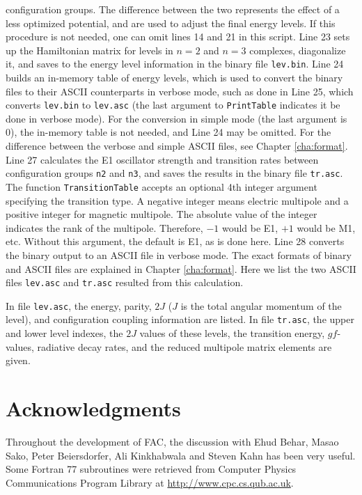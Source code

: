 configuration groups. The difference between the two represents the effect of
a less optimized potential, and are used to adjust the final energy levels. If
this procedure is not needed, one can omit lines 14 and 21 in this script. Line
23 sets up the Hamiltonian matrix for levels in $n = 2$ and $n = 3$ complexes,
diagonalize it, and saves to the energy level information in the binary file
\verb|lev.bin|. Line 24 builds an in-memory table of energy levels, which is
used to convert the binary files to their ASCII counterparts in verbose mode,
such as done in Line 25, which converts \verb|lev.bin| to \verb|lev.asc| (the
last argument to \verb|PrintTable| indicates it be done in verbose mode). For
the conversion in simple mode (the last argument is 0), the in-memory table is
not needed, and Line 24 may be omitted. For the difference between the verbose
and simple ASCII files, see Chapter \ref{cha:format}. Line 27 calculates the
E1 oscillator strength and transition rates between configuration groups
\verb|n2| and \verb|n3|, and saves the results in the binary file
\verb|tr.asc|. The function \verb|TransitionTable| accepts an optional 4th
integer argument specifying the transition type. A negative integer means
electric multipole and a positive integer for magnetic multipole. The absolute
value of the integer indicates the rank of the multipole. Therefore, $-1$ would
be E1, $+1$ would be M1, etc. Without this argument, the default is E1, as is
done here. Line 28 converts the binary output to an ASCII file in verbose
mode. The exact formats of binary and ASCII files are explained in Chapter
\ref{cha:format}. Here we list the two ASCII files \verb|lev.asc| and
\verb|tr.asc| resulted from this calculation. 

\lstset{numbers=none,basicstyle=\scriptsize,caption=demo/structure/lev.asc}

\lstset{numbers=none,basicstyle=\normalsize,caption=demo/structure/tr.asc}

In file \verb|lev.asc|, the energy, parity, $2J$ ($J$ is the total
angular momentum of the level), and configuration coupling information are
listed. In file \verb|tr.asc|, the upper and lower level indexes, the $2J$
values of these levels, the transition energy, $gf$-values, radiative
decay rates, and the reduced multipole matrix elements are given.

\section{Acknowledgments}
Throughout the development of FAC, the discussion with Ehud Behar, Masao
Sako, Peter Beiersdorfer, Ali Kinkhabwala and Steven Kahn has been very
useful. Some Fortran 77 subroutines were retrieved from Computer Physics
Communications Program Library at
\url{http://www.cpc.cs.qub.ac.uk}.

